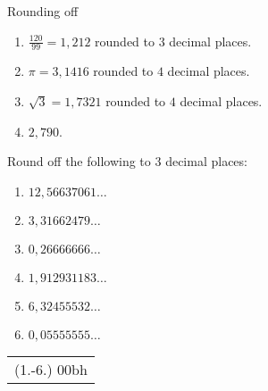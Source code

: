 \begin{wex}{Rounding off }
{\begin{minipage}{\textwidth}
\begin{enumerate}[itemsep=5pt, label=\textbf{\arabic*}. ]
\end{enumerate}
\end{minipage}
\begin{minipage}{\textwidth}
\vspace{1ex}
\begin{enumerate}[itemsep=5pt, label=\textbf{\arabic*}. ]
\item $\frac{120}{99}=1,212$ rounded to $3$ decimal places.
\item $\pi =3,1416$  rounded to $4$ decimal places.
\item $\sqrt{3}=1,7321$ rounded to $4$ decimal places.
\item $2,790$.
\end{enumerate}
\end{minipage}
}  
\end{wex}



\begin{exercises}{}
{Round off the following to $3$ decimal places:
\begin{enumerate}[itemsep=3pt, label=\textbf{\arabic*}. ]
\item $12,56637061\ldots$ %
\item $3,31662479\ldots$ %
\item $0,26666666\ldots$ %
\item $1,912931183\ldots$ %
\item $6,32455532\ldots$ %
\item $0,05555555\ldots$ %
\end{enumerate}
\practiceinfo 
\par 
 \par \begin{tabular}[h]{c}
 (1.-6.) 00bh\end{tabular}
}

\end{exercises}


